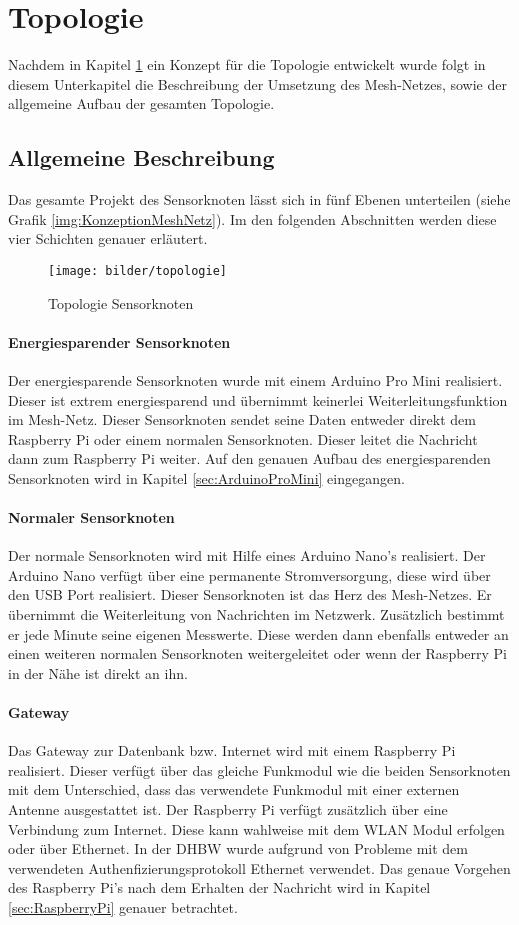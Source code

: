 \section{Topologie}
\label{sec:RealisierungTopologie}
Nachdem in Kapitel \ref{sec:KonzeptionMeshNetz} ein Konzept für die Topologie entwickelt wurde folgt in diesem Unterkapitel die Beschreibung der Umsetzung des Mesh-Netzes, sowie der allgemeine Aufbau der gesamten Topologie. 
\subsection{Allgemeine Beschreibung}
Das gesamte Projekt des Sensorknoten lässt sich in fünf Ebenen unterteilen (siehe Grafik \ref{img:KonzeptionMeshNetz}). Im den folgenden Abschnitten werden diese vier Schichten genauer erläutert.
\begin{figure}
	\centering
	\texttt{[image: bilder/topologie]}
	\caption{Topologie Sensorknoten}
	\label{sec:KonzeptionMeshNetz}
\end{figure}
\paragraph{Energiesparender Sensorknoten} Der energiesparende Sensorknoten wurde mit einem Arduino Pro Mini realisiert. Dieser ist extrem energiesparend und übernimmt keinerlei Weiterleitungsfunktion im Mesh-Netz. Dieser Sensorknoten sendet seine Daten entweder direkt dem Raspberry Pi oder einem normalen Sensorknoten. Dieser leitet die  Nachricht dann zum Raspberry Pi weiter. Auf den genauen Aufbau des energiesparenden Sensorknoten wird in Kapitel \ref{sec:ArduinoProMini} eingegangen.
\paragraph{Normaler Sensorknoten} Der normale Sensorknoten wird mit Hilfe eines Arduino Nano’s realisiert. Der Arduino Nano verfügt über eine permanente Stromversorgung, diese wird über den USB Port realisiert. Dieser Sensorknoten ist das Herz des Mesh-Netzes. Er übernimmt die Weiterleitung von Nachrichten im Netzwerk. Zusätzlich bestimmt er jede Minute seine eigenen Messwerte. Diese werden dann ebenfalls entweder an einen weiteren normalen Sensorknoten weitergeleitet oder wenn der Raspberry Pi in der Nähe ist direkt an ihn. 
\paragraph{Gateway} Das Gateway zur Datenbank bzw. Internet wird mit einem Raspberry Pi realisiert. Dieser verfügt über das gleiche Funkmodul wie die beiden Sensorknoten mit dem Unterschied, dass das verwendete Funkmodul mit einer externen Antenne ausgestattet ist. Der Raspberry Pi verfügt zusätzlich über eine Verbindung zum Internet. Diese kann wahlweise mit dem WLAN Modul erfolgen oder über Ethernet. In der DHBW wurde aufgrund von Probleme mit dem verwendeten Authenfizierungsprotokoll  Ethernet verwendet. Das genaue Vorgehen des Raspberry Pi’s nach dem Erhalten der Nachricht wird in Kapitel \ref{sec:RaspberryPi} genauer betrachtet.
